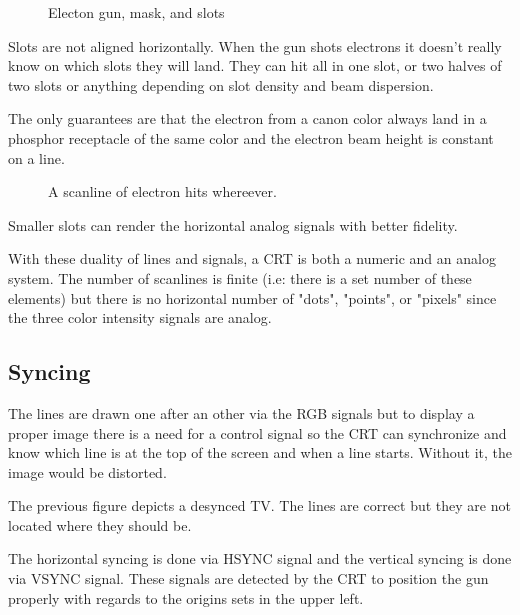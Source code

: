 



\begin{figure}[H]
\caption*{Electon gun, mask, and slots}
\end{figure}

Slots are not aligned horizontally. When the gun shots electrons it doesn't really know on which slots they will land. They can hit all in one slot, or two halves of two slots or anything depending on slot density and beam dispersion. 

The only guarantees are that the electron from a canon color always land in a phosphor receptacle of the same color and the electron beam height is constant on a line.

\begin{figure}[H]
\caption*{A scanline of electron hits whereever.}
\end{figure}

Smaller slots can render the horizontal analog signals with better fidelity.





 With these duality of lines and signals, a CRT is both a numeric and an analog system. The number of scanlines is finite (i.e: there is a set number of these elements) but there is no horizontal number of "dots", "points", or "pixels" since the three color intensity signals are analog.


\subsection{Syncing}
The lines are drawn one after an other via the RGB signals but to display a proper image there is a need for a control signal so the CRT can synchronize and know which line is at the top of the screen and when a line starts. Without it, the image would be distorted. 



The previous figure depicts a desynced TV. The lines are correct but they are not located where they should be.

The horizontal syncing is done via HSYNC signal and the vertical syncing is done via VSYNC signal. These signals are detected by the CRT to position the gun properly with regards to the origins sets in the upper left.

